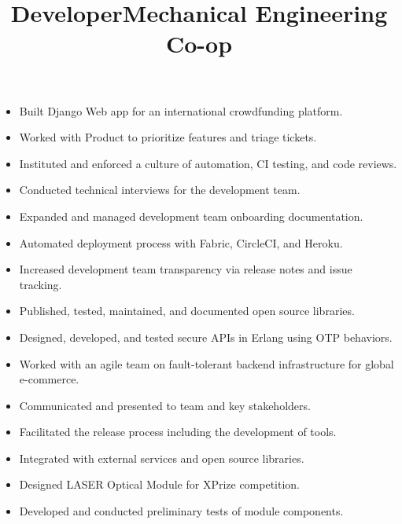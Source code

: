 \documentclass[line]{res}
\begin{document}
\begin{resume}
\begin{position}
\begin{itemize}
\item Built Django Web app for an international crowdfunding platform.
\item Worked with Product to prioritize features and triage tickets.
\item Instituted and enforced a culture of automation, CI testing, and code reviews.
\item Conducted technical interviews for the development team.
\item Expanded and managed development team onboarding documentation.
\item Automated deployment process with Fabric, CircleCI, and Heroku.
\item Increased development team transparency via release notes and issue tracking.
\item Published, tested, maintained, and documented open source libraries.

\end{itemize}
\end{position}


\title{Developer}
\begin{position}
\noindent
\vspace {-10 pt}
\begin{itemize}
\item Designed, developed, and tested secure APIs in Erlang using OTP behaviors.
\item Worked with an agile team on fault-tolerant backend infrastructure for global e-commerce.
\item Communicated and presented to team and key stakeholders.
\item Facilitated the release process including the development of tools.
\item Integrated with external services and open source libraries.
\end{itemize}
\end{position}

\title{Mechanical Engineering Co-op}
\begin{position}
\noindent
\vspace {-10 pt}
\begin{itemize}
\item Designed LASER Optical Module for XPrize competition.
\item Developed and conducted preliminary tests of module components.
\end{itemize}
\end{position}


\end{resume}
\end{document}
